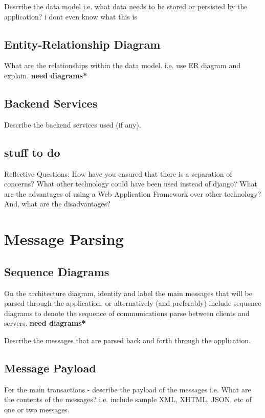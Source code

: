 \documentclass{sig-alt-release2}
\begin{document}
Describe the data model i.e. what data needs to be stored or persisted by the application? i dont even know what this is

\subsection{Entity-Relationship Diagram}

What are the relationships within the data model.
i.e. use ER diagram and explain. {\bf *need diagrams*} 

\subsection{Backend Services}

Describe the backend services used (if any).

\subsection{stuff to do} 

Reflective Questions: 
How have you ensured that there is a separation of concerns? 
What other technology could have been used instead of django? 
What are the advantages of using a Web Application Framework over other technology? 
And, what are the disadvantages?

\section{Message Parsing}

\subsection{Sequence Diagrams}

On the architecture diagram, identify and label the main messages that will be parsed through the application.
or alternatively (and preferably) include sequence diagrams to denote the sequence of communications parse between clients and servers. {\bf *need diagrams*} 

Describe the messages that are parsed back and forth through the application.

\subsection{Message Payload}

For the main transactions - describe the payload of the messages 
i.e. What are the contents of the messages? i.e. include sample XML, XHTML, JSON, etc of one or two messages.
\end{document}
